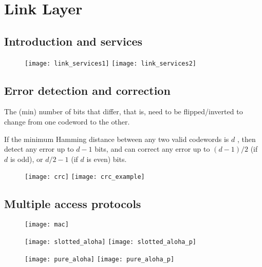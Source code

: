 \section{Link Layer}

\subsection{Introduction and services}

\begin{figure}[H]
  \centering
  \texttt{[image: link\_services1]}
  \texttt{[image: link\_services2]}
\end{figure}

\subsection{Error detection and correction}

 The (min) number of bits that differ, that is, need to
be flipped/inverted to change from one codeword to the other.

If the minimum Hamming distance between any two valid codewords is $d$ , then
detect any error up to $d-1$ bits, and can correct any error up to $(d-1)/2$ (if
$d$ is odd), or $d/2-1$ (if $d$ is even) bits.

\begin{figure}[H]
  \centering
  \texttt{[image: crc]}
  \texttt{[image: crc\_example]}
\end{figure}

\subsection{Multiple access protocols}

\begin{figure}[H]
  \centering
  \texttt{[image: mac]}
\end{figure}

\begin{figure}[H]
  \centering
  \texttt{[image: slotted\_aloha]}
  \texttt{[image: slotted\_aloha\_p]}
\end{figure}

\begin{figure}[H]
  \centering
  \texttt{[image: pure\_aloha]}
  \texttt{[image: pure\_aloha\_p]}
\end{figure}

